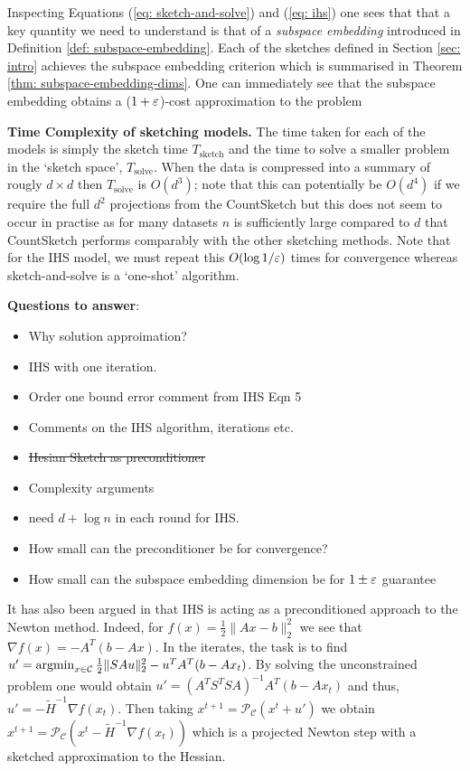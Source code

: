 Inspecting Equations (\ref{eq: sketch-and-solve}) and (\ref{eq: ihs}) one
sees that that a key quantity we need to understand is that of
a \textit{subspace embedding} introduced in Definition \ref{def: subspace-embedding}.
Each of the sketches defined in Section \ref{sec: intro} achieves the subspace
embedding criterion which is summarised in Theorem
\ref{thm: subspace-embedding-dims}.
One can immediately see that the subspace embedding obtains a ($1+\varepsilon$)-cost
approximation to the problem

\noindent \textbf{Time Complexity of sketching models.}
The time taken for each of the models is simply the sketch time $T_{\text{sketch}}$
and the time to solve a smaller problem in the `sketch space', $T_{\text{solve}}$.
When the data is compressed into a summary of rougly $d \times d$ then $T_{\text{solve}}$
is $O(d^3)$; note that this can potentially be $O(d^4)$ if we require the full
$d^2$ projections from the CountSketch but this does not seem to occur in
practise as for many datasets $n$ is sufficiently large compared to $d$ that
CountSketch performs comparably with the other sketching methods.
Note that for the IHS model, we must repeat this $O(\log 1/\varepsilon)$ times for
convergence whereas sketch-and-solve is a `one-shot' algorithm.


\textbf{Questions to answer}:
\begin{itemize}
  \item Why solution approimation?
  \item IHS with one iteration.
  \item Order one bound error comment from IHS Eqn 5
  \item Comments on the IHS algorithm, iterations etc.
  \item \sout{Hesian Sketch as preconditioner}
  \item Complexity arguments
  \item need $d + \log n$ in each round for IHS.
  \item How small can the preconditioner be for convergence?
  \item How small can the subspace embedding dimension be for $1\pm \varepsilon$ guarantee
\end{itemize}

\color{red}
It has also been argued in \cite{wang2017sketching} that IHS is acting as
a preconditioned approach to the Newton method.
Indeed, for $f(x) = \frac{1}{2} \|Ax-b\|_2^2$ we see that $\nabla f(x) =
-A^T(b-Ax)$.
In the iterates, the task is to find $u' = \operatorname*{argmin}_{x \in \mathcal{C}}
\frac{1}{2}\|SAu\|_2^2 - u^TA^T(b-Ax_t)$.
By solving the unconstrained problem one would obtain $u' = (A^TS^TSA)^{-1}
A^T(b-Ax_t)$ and thus, $u' = - \tilde{H}^{-1} \nabla f(x_t)$.
Then taking $x^{t+1} = \mathcal{P}_{\mathcal{C}} (x^t + u')$ we obtain
$x^{t+1} = \mathcal{P}_{\mathcal{C}} (x^t - \tilde{H}^{-1}\nabla f(x_t))$
which is a projected Newton step with a sketched approximation to
the Hessian.
\color{black}

